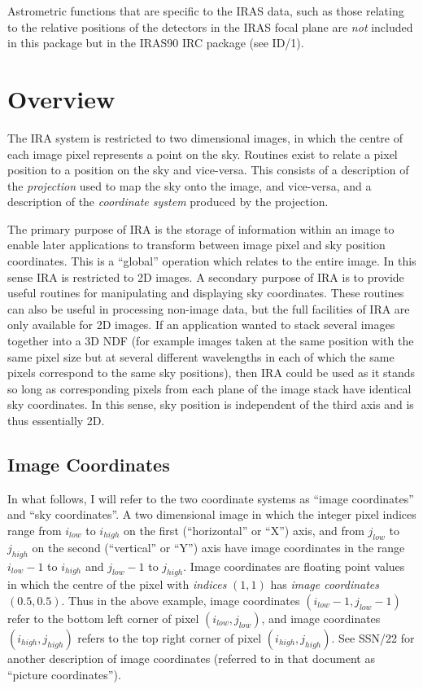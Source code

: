 Astrometric functions that are specific to the IRAS data, such as those 
relating to the relative positions of the detectors in the IRAS focal plane are 
{\em not} included in this package but in the IRAS90 IRC package (see ID/1).

\section {Overview}

The IRA system is restricted to two dimensional images, in which the centre of 
each image pixel represents a point on the sky. Routines exist to relate a pixel
position to a position on the sky and vice-versa. This consists of a description
of the {\em projection} used to map the sky onto the image, and vice-versa, and
a description of the {\em coordinate system} produced by the projection. 

The primary purpose of IRA is the storage of information within an image to
enable later applications to transform between image pixel and sky position
coordinates. This is a ``global'' operation which relates to the entire image.
In this sense IRA is restricted to 2D images. A secondary purpose of IRA is to
provide useful routines for manipulating and displaying sky coordinates. These
routines can also be useful in processing non-image data, but the full
facilities of IRA are only available for 2D images. If an application wanted to
stack several images together into a 3D NDF (for example images taken at the
same position with the same pixel size but at several different wavelengths in
each of which the same pixels correspond to the same sky positions), then IRA
could be used as it stands so long as corresponding pixels from each plane of
the image stack have identical sky coordinates. In this sense, sky position is
independent of the third axis and is thus essentially 2D. 

\subsection {Image Coordinates}
In what follows, I will refer to the two coordinate systems as ``image
coordinates'' and ``sky coordinates''. 
A two dimensional image in which the
integer pixel indices range from $i_{low}$ to $i_{high}$ on the first
(``horizontal'' or ``X'') axis, and from $j_{low}$ to $j_{high}$ on the second
(``vertical'' or ``Y'') axis have image coordinates in the range $i_{low}-1$ to
$i_{high}$ and $j_{low}-1$ to $j_{high}$. Image coordinates are floating point
values in which the centre of the pixel with {\em indices }
$(1,1)$ has {\em image coordinates} $(0.5,0.5)$. Thus in the above example, image
coordinates $(i_{low}-1,j_{low}-1)$ refer to the bottom left corner of pixel
$(i_{low},j_{low})$, and image coordinates $(i_{high},j_{high})$ refers to the
top right corner of pixel $(i_{high},j_{high})$. See SSN/22 for another 
description of image coordinates (referred to in that document as ``picture 
coordinates'').

